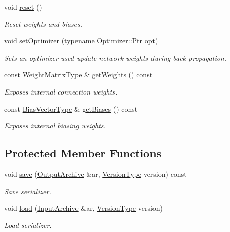 \begin{DoxyCompactItemize}
void \hyperlink{classffnn_1_1layer_1_1_fully_connected_a66c69f57c587558acfa5d32110baba57}{reset} ()
\begin{DoxyCompactList}\small\item\em Reset weights and biases. \end{DoxyCompactList}\item 
void \hyperlink{classffnn_1_1layer_1_1_fully_connected_a9f54f83b0b95aea9ec9b9f300ee24e0f}{set\-Optimizer} (typename \hyperlink{classffnn_1_1optimizer_1_1_optimizer_ac03e7181934bf0c12a97fc67a60484ab}{Optimizer\-::\-Ptr} opt)
\begin{DoxyCompactList}\small\item\em Sets an optimizer used update network weights during back-\/propagation. \end{DoxyCompactList}\item 
const \hyperlink{classffnn_1_1layer_1_1_fully_connected_a4ceb72064ac9a73a0907cc369d229da0}{Weight\-Matrix\-Type} \& \hyperlink{classffnn_1_1layer_1_1_fully_connected_a055cc07f210b47e31278bc0bf6b8e909}{get\-Weights} () const 
\begin{DoxyCompactList}\small\item\em Exposes internal connection weights. \end{DoxyCompactList}\item 
const \hyperlink{classffnn_1_1layer_1_1_fully_connected_a926ff519682fa1bedd4c38159d5fd4bb}{Bias\-Vector\-Type} \& \hyperlink{classffnn_1_1layer_1_1_fully_connected_a54ab6b0b965d3593525817752fd39c39}{get\-Biases} () const 
\begin{DoxyCompactList}\small\item\em Exposes internal biasing weights. \end{DoxyCompactList}\end{DoxyCompactItemize}
\subsection*{Protected Member Functions}
\begin{DoxyCompactItemize}
\item 
void \hyperlink{classffnn_1_1layer_1_1_fully_connected_a858f04f0752096d74e4d9876edb4c73e}{save} (\hyperlink{classffnn_1_1traits_1_1_serializable_a08d986df75d363fa79506d4f6045cb9f}{Output\-Archive} \&ar, \hyperlink{classffnn_1_1traits_1_1_serializable_a08924b3b7d20cb3cb6eafe517d4f7b30}{Version\-Type} version) const 
\begin{DoxyCompactList}\small\item\em Save serializer. \end{DoxyCompactList}\item 
void \hyperlink{classffnn_1_1layer_1_1_fully_connected_a4d449a95d01e3ad04a7813d70d296e0c}{load} (\hyperlink{classffnn_1_1traits_1_1_serializable_a6e626759259f8f370dd4303b4441a234}{Input\-Archive} \&ar, \hyperlink{classffnn_1_1traits_1_1_serializable_a08924b3b7d20cb3cb6eafe517d4f7b30}{Version\-Type} version)
\begin{DoxyCompactList}\small\item\em Load serializer. \end{DoxyCompactList}\end{DoxyCompactItemize}
